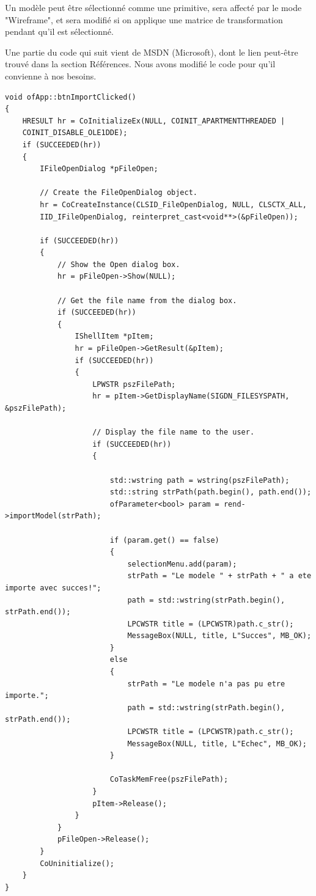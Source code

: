 Un modèle peut être sélectionné comme une primitive, sera affecté par le mode "Wireframe", et sera modifié si on applique une matrice de transformation pendant qu'il est sélectionné.

Une partie du code qui suit vient de MSDN (Microsoft), dont le lien peut-être trouvé dans la section Références. Nous avons modifié le code pour qu'il convienne à nos besoins.

\begin{lstlisting}
void ofApp::btnImportClicked()
{
	HRESULT hr = CoInitializeEx(NULL, COINIT_APARTMENTTHREADED |
	COINIT_DISABLE_OLE1DDE);
	if (SUCCEEDED(hr))
	{
		IFileOpenDialog *pFileOpen;
		
		// Create the FileOpenDialog object.
		hr = CoCreateInstance(CLSID_FileOpenDialog, NULL, CLSCTX_ALL,
		IID_IFileOpenDialog, reinterpret_cast<void**>(&pFileOpen));
		
		if (SUCCEEDED(hr))
		{
			// Show the Open dialog box.
			hr = pFileOpen->Show(NULL);
			
			// Get the file name from the dialog box.
			if (SUCCEEDED(hr))
			{
				IShellItem *pItem;
				hr = pFileOpen->GetResult(&pItem);
				if (SUCCEEDED(hr))
				{
					LPWSTR pszFilePath;
					hr = pItem->GetDisplayName(SIGDN_FILESYSPATH, &pszFilePath);
					
					// Display the file name to the user.
					if (SUCCEEDED(hr))
					{
						
						std::wstring path = wstring(pszFilePath);
						std::string strPath(path.begin(), path.end());
						ofParameter<bool> param = rend->importModel(strPath);
						
						if (param.get() == false)
						{
							selectionMenu.add(param);
							strPath = "Le modele " + strPath + " a ete importe avec succes!";
							path = std::wstring(strPath.begin(), strPath.end());
							LPCWSTR title = (LPCWSTR)path.c_str();
							MessageBox(NULL, title, L"Succes", MB_OK);
						}
						else
						{
							strPath = "Le modele n'a pas pu etre importe.";
							path = std::wstring(strPath.begin(), strPath.end());
							LPCWSTR title = (LPCWSTR)path.c_str();
							MessageBox(NULL, title, L"Echec", MB_OK);
						}
						
						CoTaskMemFree(pszFilePath);
					}
					pItem->Release();
				}
			}
			pFileOpen->Release();
		}
		CoUninitialize();
	}
}
\end{lstlisting}

